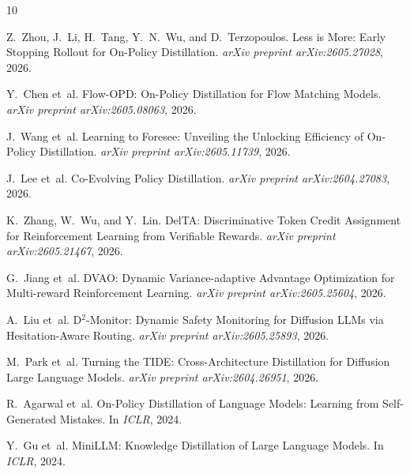 \documentclass[11pt,a4paper]{article}
\begin{document}

\begin{thebibliography}{10}

Z.~Zhou, J.~Li, H.~Tang, Y.~N.~Wu, and D.~Terzopoulos.
\newblock Less is More: Early Stopping Rollout for On-Policy Distillation.
\newblock \emph{arXiv preprint arXiv:2605.27028}, 2026.

Y.~Chen et~al.
\newblock Flow-OPD: On-Policy Distillation for Flow Matching Models.
\newblock \emph{arXiv preprint arXiv:2605.08063}, 2026.

J.~Wang et~al.
\newblock Learning to Foresee: Unveiling the Unlocking Efficiency of On-Policy Distillation.
\newblock \emph{arXiv preprint arXiv:2605.11739}, 2026.

J.~Lee et~al.
\newblock Co-Evolving Policy Distillation.
\newblock \emph{arXiv preprint arXiv:2604.27083}, 2026.

K.~Zhang, W.~Wu, and Y.~Lin.
\newblock DelTA: Discriminative Token Credit Assignment for Reinforcement Learning from Verifiable Rewards.
\newblock \emph{arXiv preprint arXiv:2605.21467}, 2026.

G.~Jiang et~al.
\newblock DVAO: Dynamic Variance-adaptive Advantage Optimization for Multi-reward Reinforcement Learning.
\newblock \emph{arXiv preprint arXiv:2605.25604}, 2026.

A.~Liu et~al.
\newblock D$^2$-Monitor: Dynamic Safety Monitoring for Diffusion LLMs via Hesitation-Aware Routing.
\newblock \emph{arXiv preprint arXiv:2605.25893}, 2026.

M.~Park et~al.
\newblock Turning the TIDE: Cross-Architecture Distillation for Diffusion Large Language Models.
\newblock \emph{arXiv preprint arXiv:2604.26951}, 2026.

R.~Agarwal et~al.
\newblock On-Policy Distillation of Language Models: Learning from Self-Generated Mistakes.
\newblock In \emph{ICLR}, 2024.

Y.~Gu et~al.
\newblock MiniLLM: Knowledge Distillation of Large Language Models.
\newblock In \emph{ICLR}, 2024.

\end{thebibliography}
\end{document}
